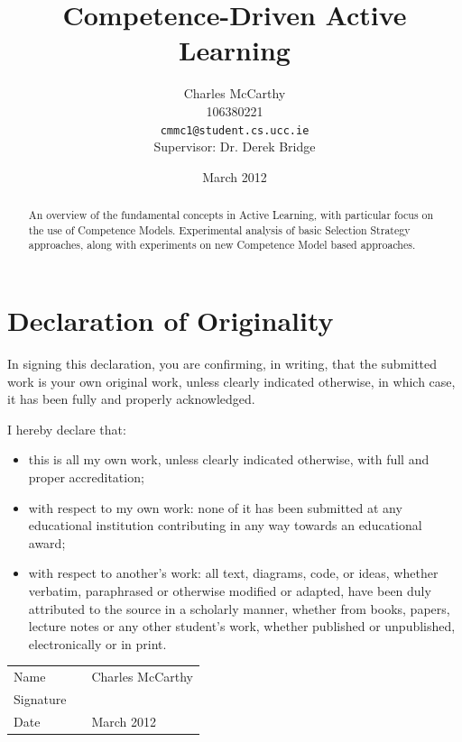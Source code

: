 \documentclass[a4paper,11pt]{report}
\title{Competence-Driven Active Learning}
\author{Charles McCarthy\\
  106380221\\
  \texttt{cmmc1@student.cs.ucc.ie}
  \\Supervisor: Dr. Derek Bridge}
\date{March 2012}
\begin{document}
\maketitle

\begin{abstract}
An overview of the fundamental concepts in Active Learning, with particular focus on the use of Competence Models. Experimental analysis of basic Selection Strategy approaches, along with experiments on new Competence Model based approaches.
\end{abstract}

\chapter*{Declaration of Originality}
\vspace*{\fill}
In signing this declaration, you are confirming, in writing, that the submitted work is your own original work, unless clearly indicated otherwise, in which case, it has been fully and properly acknowledged.

I hereby declare that:
\begin{itemize}
	\item this is all my own work, unless clearly indicated otherwise, with full and proper accreditation;
	\item with respect to my own work: none of it has been submitted at any educational institution contributing in any way towards an educational award;
	\item with respect to another's work: all text, diagrams, code, or ideas, whether verbatim, paraphrased or otherwise modified or adapted, have been duly attributed to the source in a scholarly manner, whether from books, papers, lecture notes or any other student's work, whether published or unpublished, electronically or in print. 
\end{itemize}

{
\renewcommand{\arraystretch}{4.5}
\begin{center}
 	\begin{tabular}{l @{:} p{0.4in} l}
		Name & & Charles McCarthy \\
		Signature & & \makebox[2.5in]{\hrulefill} \\
		Date & & March 2012 \\
	\end{tabular}
\end{center}
}
\vspace{\fill}
\end{document}

